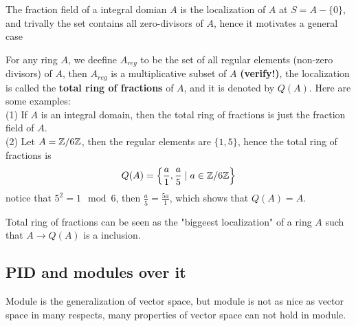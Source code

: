     The fraction field of a integral domian \(A\) is the localization of \(A\) at \(S = A-\{0\}\), and trivally the set contains all zero-divisors of \(A\), hence it motivates a general case
    \begin{example}
        For any ring \(A\), we deefine \(A_{reg}\) to be the set of all regular elements (non-zero divisors) of \(A\), then \(A_{reg}\) is a multiplicative subset of \(A\) \textbf{(verify!)}, the localization is called the \textbf{total ring of fractions} of \(A\), and it is denoted by \(Q(A)\). Here are some examples:\\

        (1) If \(A\) is an integral domain, then the total ring of fractions is just the fraction field of \(A\).\\

        (2) Let \(A = \mathbb{Z}/6\mathbb{Z}\), then the regular elements are \(\{1,5\}\), hence the total ring of fractions is
        \[Q(A) = \left\{\frac{a}{1}, \frac{a}{5} \mid a \in \mathbb{Z}/6\mathbb{Z}\right\} \]
        notice that \(5^2 = 1 \mod 6\), then \(\frac{a}{5} = \frac{5a}{1}\), which shows that \(Q(A) = A\).\\
    \end{example}

    Total ring of fractions can be seen as the "biggeest localization" of a ring \(A\) such that \(A \to Q(A)\) is a inclusion.

\subsection{PID and modules over it}


Module is the generalization of vector space, but module is not as nice as vector space in many respects, many properties of vector space can not hold in module.

